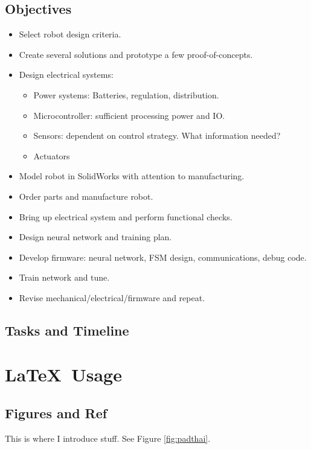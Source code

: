 \documentclass[12pt,letterpaper,titlepage]{report}
\begin{document}
\section{Objectives}
\begin{itemize}
	\item Select robot design criteria.
	\item Create several solutions and prototype a few proof-of-concepts.
	\item Design electrical systems:
	\begin{itemize}
		\item Power systems: Batteries, regulation, distribution.
		\item Microcontroller: sufficient processing power and IO.
		\item Sensors: dependent on control strategy. What information needed?
		\item Actuators
	\end{itemize}
	\item Model robot in SolidWorks with attention to manufacturing.
	\item Order parts and manufacture robot.
	\item Bring up electrical system and perform functional checks.
	\item Design neural network and training plan.
	\item Develop firmware: neural network, FSM design, communications, debug code.
	\item Train network and tune.
	\item Revise mechanical/electrical/firmware and repeat.
\end{itemize}


\section{Tasks and Timeline}



\chapter{\LaTeX\ Usage}

\section{Figures and Ref}
This is where I introduce stuff. See Figure \ref{fig:padthai}.
\end{document}
